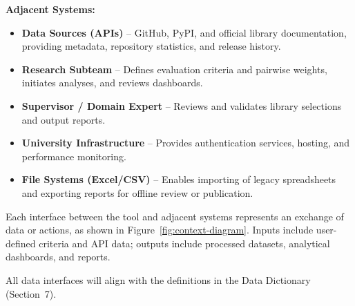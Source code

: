\documentclass[12pt]{article}
\begin{document}
\noindent
\textbf{Adjacent Systems:}
\begin{itemize}
    \item \textbf{Data Sources (APIs)} – GitHub, PyPI, and official library documentation, providing metadata, repository statistics, and release history.
    \item \textbf{Research Subteam} – Defines evaluation criteria and pairwise weights, initiates analyses, and reviews dashboards.
    \item \textbf{Supervisor / Domain Expert} – Reviews and validates library selections and output reports.
    \item \textbf{University Infrastructure} – Provides authentication services, hosting, and performance monitoring.
    \item \textbf{File Systems (Excel/CSV)} – Enables importing of legacy spreadsheets and exporting reports for offline review or publication.
\end{itemize}

\noindent
Each interface between the tool and adjacent systems represents an exchange of data or actions, as shown in Figure~\ref{fig:context-diagram}. Inputs include user-defined criteria and API data; outputs include processed datasets, analytical dashboards, and reports.

All data interfaces will align with the definitions in the Data Dictionary (Section~7).
\end{document}
